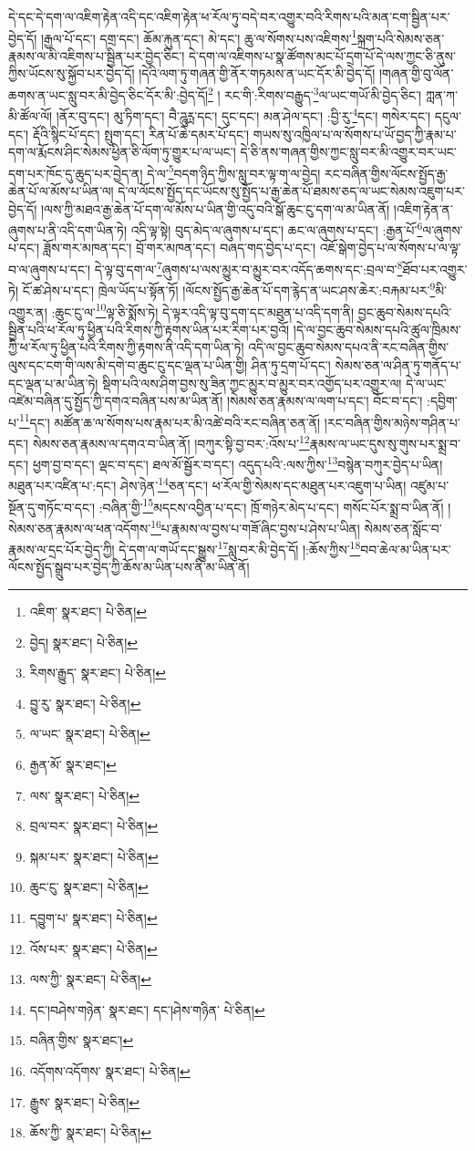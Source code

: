 དེ་དང་དེ་དག་ལ་འཇིག་རྟེན་འདི་དང་འཇིག་རྟེན་ཕ་རོལ་ཏུ་བདེ་བར་འགྱུར་བའི་རིགས་པའི་མན་ངག་སྦྱིན་པར་བྱེད་དོ། །རྒྱལ་པོ་དང་། དགྲ་དང་། ཆོམ་རྐུན་དང་། མེ་དང་། ཆུ་ལ་སོགས་པས་འཇིགས་\footnote{འཇིག་  སྣར་ཐང་།  པེ་ཅིན། }སྐྲག་པའི་སེམས་ཅན་རྣམས་ལ་མི་འཇིགས་པ་སྦྱིན་པར་བྱེད་ཅིང་། དེ་དག་ལ་འཇིགས་པ་སྣ་ཚོགས་མང་པོ་དྲག་པོ་དེ་ལས་ཀྱང་ཅི་ནུས་ཀྱིས་ཡོངས་སུ་སྐྱོབ་པར་བྱེད་དོ། །དེའི་ལག་ཏུ་གཞན་གྱི་ནོར་གཏམས་ན་ཡང་དོར་མི་བྱེད་དོ། །གཞན་གྱི་བུ་ལོན་ཆགས་ན་ཡང་སླུ་བར་མི་བྱེད་ཅིང་དོར་མི་:བྱེད་དོ།\footnote{བྱེད།  སྣར་ཐང་།  པེ་ཅིན། } །
རང་གི་:རིགས་བརྒྱུད་\footnote{རིགས་རྒྱུད་  སྣར་ཐང་།  པེ་ཅིན། }ལ་ཡང་གཡོ་མི་བྱེད་ཅིང་། ཀླན་ཀ་མི་ཚོལ་ལོ། །ནོར་བུ་དང་། མུ་ཏིག་དང་། བཻ་ཌཱུཪྻ་དང་། དུང་དང་། མན་ཤེལ་དང་། :བྱི་རུ་\footnote{བྱུ་རུ་  སྣར་ཐང་།  པེ་ཅིན། }དང་། གསེར་དང་། དངུལ་དང་། རྡོའི་སྙིང་པོ་དང་། སྤུག་དང་། རིན་པོ་ཆེ་དམར་པོ་དང་། གཡས་སུ་འཁྱིལ་པ་ལ་སོགས་པ་ཡོ་བྱད་ཀྱི་རྣམ་པ་དག་ལ་རྨོངས་ཤིང་སེམས་ཕྱིན་ཅི་ལོག་ཏུ་གྱུར་པ་ལ་ཡང་། དེ་ཅི་ནས་གཞན་གྱིས་ཀྱང་སླུ་བར་མི་འགྱུར་བར་ཡང་དག་པར་ཁོང་དུ་ཆུད་པར་བྱེད་ན། དེ་ལ་\footnote{ལ་ཡང་  སྣར་ཐང་།  པེ་ཅིན། }བདག་ཉིད་ཀྱིས་སླུ་བར་ལྟ་ག་ལ་བྱེད། རང་བཞིན་གྱིས་ལོངས་སྤྱོད་རྒྱ་ཆེན་པོ་ལ་མོས་པ་ཡིན་ལ། དེ་ལ་ལོངས་སྤྱོད་དང་ཡོངས་སུ་སྤྱོད་པ་རྒྱ་ཆེན་པོ་ཐམས་ཅད་ལ་ཡང་སེམས་འཇུག་པར་བྱེད་དོ། །ལས་ཀྱི་མཐའ་རྒྱ་ཆེན་པོ་དག་ལ་མོས་པ་ཡིན་གྱི་འདུ་བའི་སྒོ་ཆུང་ངུ་དག་ལ་མ་ཡིན་ནོ། །འཇིག་རྟེན་ན་ཞུགས་པ་ནི་འདི་དག་ཡིན་ཏེ། འདི་ལྟ་སྟེ། བུད་མེད་ལ་ཞུགས་པ་དང་། ཆང་ལ་ཞུགས་པ་དང་། :རྒྱན་པོ་\footnote{རྒྱན་མོ་  སྣར་ཐང་། }ལ་ཞུགས་པ་དང་། ཟློས་གར་མཁན་དང་། བྲོ་གར་མཁན་དང་། བཞད་གད་བྱེད་པ་དང་། འཇོ་སྒེག་བྱེད་པ་ལ་སོགས་པ་ལ་ལྟ་བ་ལ་ཞུགས་པ་དང་། དེ་ལྟ་བུ་དག་ལ་\footnote{ལས་  སྣར་ཐང་།  པེ་ཅིན། }ཞུགས་པ་ལས་མྱུར་བ་མྱུར་བར་འདོད་ཆགས་དང་:བྲལ་བ་\footnote{བྲལ་བར་  སྣར་ཐང་།  པེ་ཅིན། }ཐོབ་པར་འགྱུར་ཏེ། ངོ་ཚ་ཤེས་པ་དང་། ཁྲེལ་ཡོད་པ་སྟོན་ཏོ། །ལོངས་སྤྱོད་རྒྱ་ཆེན་པོ་དག་རྙེད་ན་ཡང་ཤས་ཆེར་:བརྐམ་པར་\footnote{སྐམ་པར་  སྣར་ཐང་།  པེ་ཅིན། }མི་འགྱུར་ན། :ཆུང་ངུ་ལ་\footnote{ཆུང་ངུ་  སྣར་ཐང་།  པེ་ཅིན། }ལྟ་ཅི་སྨོས་ཏེ། དེ་ལྟར་འདི་ལྟ་བུ་དག་དང་མཐུན་པ་འདི་དག་ནི། བྱང་ཆུབ་སེམས་དཔའི་སྦྱིན་པའི་ཕ་རོལ་ཏུ་ཕྱིན་པའི་རིགས་ཀྱི་རྟགས་ཡིན་པར་རིག་པར་བྱའོ། །དེ་ལ་བྱང་ཆུབ་སེམས་དཔའི་ཚུལ་ཁྲིམས་ཀྱི་ཕ་རོལ་ཏུ་ཕྱིན་པའི་རིགས་ཀྱི་རྟགས་ནི་འདི་དག་ཡིན་ཏེ། འདི་ལ་བྱང་ཆུབ་སེམས་དཔའ་ནི་རང་བཞིན་གྱིས་ལུས་དང་ངག་གི་ལས་མི་དགེ་བ་ཆུང་ངུ་དང་ལྡན་པ་ཡིན་གྱི། ཤིན་ཏུ་དྲག་པོ་དང་། སེམས་ཅན་ལ་ཤིན་ཏུ་གནོད་པ་དང་ལྡན་པ་མ་ཡིན་ཏེ། སྡིག་པའི་ལས་ཤིག་བྱས་སུ་ཟིན་ཀྱང་མྱུར་བ་མྱུར་བར་འགྱོད་པར་འགྱུར་ལ། དེ་ལ་ཡང་འཛེམ་བཞིན་དུ་སྤྱོད་ཀྱི་དགའ་བཞིན་པས་མ་ཡིན་ནོ། །སེམས་ཅན་རྣམས་ལ་ལག་པ་དང་། བོང་བ་དང་། :དབྱིག་པ་\footnote{དབྱུག་པ་  སྣར་ཐང་།  པེ་ཅིན། }དང་། མཚོན་ཆ་ལ་སོགས་པས་རྣམ་པར་མི་འཚེ་བའི་རང་བཞིན་ཅན་ནོ། །རང་བཞིན་གྱིས་མཉེས་གཤིན་པ་དང་། སེམས་ཅན་རྣམས་ལ་དགའ་བ་ཡིན་ནོ། །བཀུར་སྟི་བྱ་བར་:འོས་པ་\footnote{འོས་པར་  སྣར་ཐང་།  པེ་ཅིན། }རྣམས་ལ་ཡང་དུས་སུ་གུས་པར་སྨྲ་བ་དང་། ཕྱག་བྱ་བ་དང་། ལྡང་བ་དང་། ཐལ་མོ་སྦྱོར་བ་དང་། འདུད་པའི་:ལས་ཀྱིས་\footnote{ལས་ཀྱི་  སྣར་ཐང་།  པེ་ཅིན། }བསྙེན་བཀུར་བྱེད་པ་ཡིན། མཐུན་པར་འཛིན་པ་:དང་། ཤེས་ཉེན་\footnote{དང་།བཤེས་གཉེན་  སྣར་ཐང་། དང་།ཤེས་གཉིན་  པེ་ཅིན། }ཅན་དང་། ཕ་རོལ་གྱི་སེམས་དང་མཐུན་པར་འཇུག་པ་ཡིན། འཛུམ་པ་སྔོན་དུ་གཏོང་བ་དང་། :བཞིན་གྱི་\footnote{བཞིན་གྱིས་  སྣར་ཐང་། }མདངས་འབྱིན་པ་དང་། ཁྲོ་གཉེར་མེད་པ་དང་། གསོང་པོར་སྨྲ་བ་ཡིན་ནོ། །སེམས་ཅན་རྣམས་ལ་ཕན་འདོགས་\footnote{འདོགས་འདོགས་  སྣར་ཐང་།  པེ་ཅིན། }པ་རྣམས་ལ་བྱས་པ་གཟོ་ཞིང་བྱས་པ་ཤེས་པ་ཡིན། སེམས་ཅན་སློང་བ་རྣམས་ལ་དྲང་པོར་བྱེད་ཀྱི། དེ་དག་ལ་གཡོ་དང་སྒྱུས་\footnote{རྒྱུས་  སྣར་ཐང་།  པེ་ཅིན། }སླུ་བར་མི་བྱེད་དོ། །:ཆོས་ཀྱིས་\footnote{ཆོས་ཀྱི་  སྣར་ཐང་།  པེ་ཅིན། }བབ་ཆེལ་མ་ཡིན་པར་ལོངས་སྤྱོད་སྒྲུབ་པར་བྱེད་ཀྱི་ཆོས་མ་ཡིན་པས་ནི་མ་ཡིན་ནོ། 